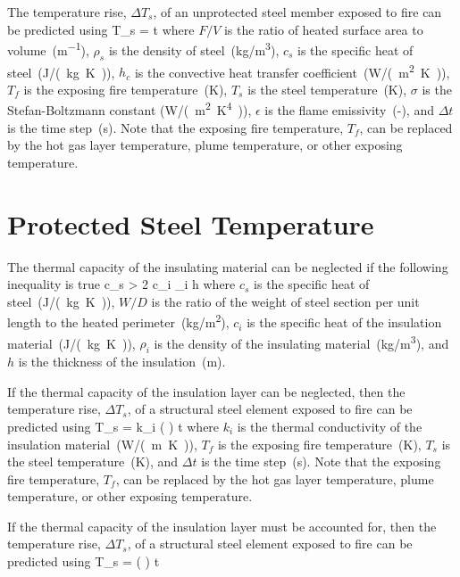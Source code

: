 The temperature rise, $\Delta T_s$, of an unprotected steel member exposed to fire can be predicted using
\be
\Delta T_s =    \Delta t
\label{eq:unprotected_steel}
\ee
where $F/V$ is the ratio of heated surface area to volume~(\si{m^{-1}}), $\rho_s$ is the density of steel~(\si{kg/m^3}), $c_s$ is the specific heat of steel~(\si{J/(kg.K)}), $h_c$ is the convective heat transfer coefficient~(\si{W/(m^2.K)}), $T_f$ is the exposing fire temperature~(\si{K}), $T_s$ is the steel temperature~(\si{K}), $\sigma$ is the Stefan-Boltzmann constant (\si{W/(m^2.K^4)}), $\epsilon$ is the flame emissivity~(-), and $\Delta t$ is the time step~(\si{s}). Note that the exposing fire temperature, $T_f$, can be replaced by the hot gas layer temperature, plume temperature, or other exposing temperature.


\section{Protected Steel Temperature}
\label{info:protected_steel_temperature}

The thermal capacity of the insulating material can be neglected if the following inequality is true
\be
c_s  > 2 c_i \rho_i h
\ee
where $c_s$ is the specific heat of steel~(\si{J/(kg.K)}), $W/D$ is the ratio of the weight of steel section per unit length to the heated perimeter~(\si{kg/m^2}), $c_i$ is the specific heat of the insulation material~(\si{J/(kg.K)}), $\rho_i$ is the density of the insulating material~(\si{kg/m^3}), and $h$ is the thickness of the insulation~(\si{m}).

If the thermal capacity of the insulation layer can be neglected, then the temperature rise, $\Delta T_s$, of a structural steel element exposed to fire can be predicted using
\be
\Delta T_s = k_i \left(  \right) \Delta t
\label{eq:protected_steel_neglect_c}
\ee
where $k_i$ is the thermal conductivity of the insulation material~(\si{W/(m.K)}), $T_f$ is the exposing fire temperature~(\si{K}), $T_s$ is the steel temperature~(\si{K}), and $\Delta t$ is the time step~(\si{s}). Note that the exposing fire temperature, $T_f$, can be replaced by the hot gas layer temperature, plume temperature, or other exposing temperature.

If the thermal capacity of the insulation layer must be accounted for, then the temperature rise, $\Delta T_s$, of a structural steel element exposed to fire can be predicted using
\be
\Delta T_s =  \left(  \right) \Delta t
\label{eq:protected_steel_account_c}
\ee

